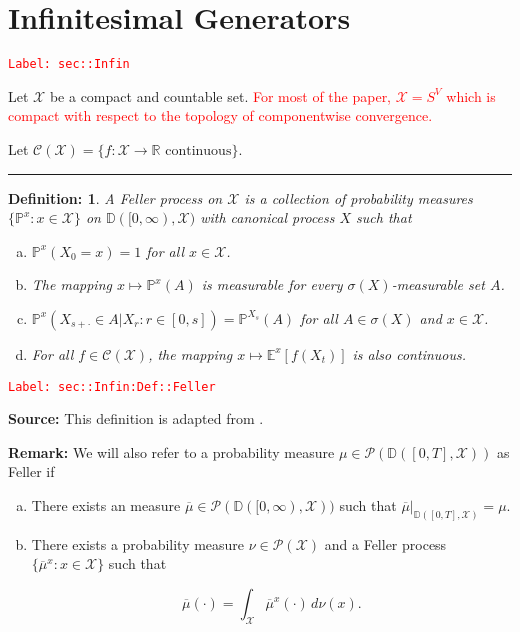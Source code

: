 \documentclass[12pt]{article}
\newcommand{\mb}{\mathbb}
\newcommand{\mc}{\mathcal}
\newcommand{\ra}{\rightarrow}
\newcommand{\ov}{\overline}
\newcommand{\te}{\text}
\newcommand{\tr}{\textcolor{red}}
\newcommand{\labe}[1]{\tr{\texttt{Label: #1}}}
\newcommand{\lin}{\rule{\linewidth}{0.4 pt}}
\newcommand{\pr}{\mb{P}}							%
\newcommand{\cad}{\mb{D}}							%
\newtheorem{defn}[thms]{Definition: }
\begin{document}
\section{Infinitesimal Generators}
\label{sec::Infin}\labe{sec::Infin}

Let \(\mc{X}\) be a compact and countable set. \tr{For most of the paper, \(\mc{X} = S^V\) which is compact with respect to the topology of componentwise convergence.}

Let \(\mc{C}(\mc{X})= \{f:\mc{X} \ra \mb{R} \te{ continuous}\}\).

\lin

\begin{defn}
A Feller process on \(\mc{X}\) is a collection of probability measures \(\{\pr^x:x \in \mc{X}\}\) on \(\cad([0,\infty),\mc{X})\) with canonical process \(X\) such that

\begin{enumerate}[(a)]
\item \(\pr^x(X_0 = x) = 1\) for all \(x \in \mc{X}\).

\item The mapping \(x \mapsto \pr^x(A)\) is measurable for every \(\sigma(X)\)-measurable set \(A\).

\item \(\pr^x(X_{s+\cdot} \in A|X_r:r \in [0,s]) = \pr^{X_s}(A)\) for all \(A \in \sigma(X)\) and \(x \in \mc{X}\).

\item For all \(f\in \mc{C}(\mc{X})\), the mapping \(x\mapsto \mb{E}^x[f(X_t)]\) is also continuous.
\end{enumerate}
\label{sec::Infin:Def::Feller}
\end{defn}
\labe{sec::Infin:Def::Feller}

\textbf{Source: } This definition is adapted from \cite[Definition 1.1,1.2]{Lig85}.

\textbf{Remark: } We will also refer to a probability measure \(\mu \in \mc{P}(\cad([0,T],\mc{X}))\) as Feller if

\begin{enumerate}[(a)]
\item There exists an measure \(\ov{\mu}\in \mc{P}(\cad([0,\infty),\mc{X}))\) such that \(\ov{\mu}|_{\cad([0,T],\mc{X})} = \mu\).

\item There exists a probability measure \(\nu\in \mc{P}(\mc{X})\) and a Feller process \(\{\ov{\mu}^x:x \in \mc{X}\}\) such that 

\[\ov{\mu}(\cdot) = \int_{\mc{X}} \ov{\mu}^x(\cdot)\,d\nu(x).\]
\end{enumerate}
\end{document}
